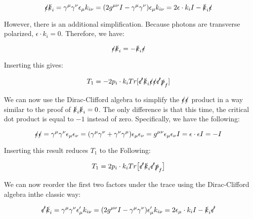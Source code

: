 \documentclass[a4]{article}
\begin{document}
    \begin{equation}
        \slashed{\epsilon} \slashed{k}_i = \gamma^{\mu} \gamma^{\nu} \epsilon_\mu k_{i \nu} = (2 g^{\mu \nu} I - \gamma^{\mu} \gamma^{\nu}) \epsilon_\mu k_{i \nu} = 2 \epsilon \cdot k_i I - \slashed{k}_i \slashed{\epsilon}
    \end{equation}

    However, there is an additional simplification. Because photons are transverse polarized, $\epsilon \cdot k_i = 0$. Therefore, we have:

    \begin{equation}
        \slashed{\epsilon} \slashed{k}_i = - \slashed{k}_i \slashed{\epsilon}
    \end{equation}

    Inserting this gives:

    \begin{equation}
        T_1 = -2 p_i \cdot k_i Tr[\slashed{\epsilon'} \slashed{k}_i \slashed{\epsilon} \slashed{\epsilon} \slashed{\epsilon'} \slashed{p}_f]
    \end{equation}

    We can now use the Dirac-Clifford algebra to simplify the $\slashed{\epsilon} \slashed{\epsilon}$ product in a way similar to the proof of $\slashed{k}_i \slashed{k}_i = 0$.
    The only difference is that this time, the critical dot product is equal to $-1$ instead of zero. Specifically, we have the following:

    \begin{equation}
        \slashed{\epsilon} \slashed{\epsilon} = \gamma^{\mu} \gamma^{\nu} \epsilon_\mu \epsilon_\nu = (\gamma^\mu \gamma^\nu + \gamma^\nu \gamma^\mu) \epsilon_{\mu} \epsilon_{\nu} = g^{\mu \nu} \epsilon_\mu \epsilon_\nu I = \epsilon \cdot \epsilon I = - I
    \end{equation}

    Inserting this result reduces $T_1$ to the Following:

    \begin{equation}
        T_1 = 2 p_i \cdot k_i Tr \big[ \slashed{\epsilon'} \slashed{k}_i \slashed{\epsilon'} \slashed{p}_f \big]
    \end{equation}

    We can now reorder the first two factors under the trace using the Dirac-Clifford algebra inthe classic way:

    \begin{equation}
        \slashed{\epsilon'} \slashed{k}_i = \gamma^{\mu} \gamma^{\nu} \epsilon'_{\mu} k_{i \nu} = (2 g^{\mu \nu} I - \gamma^{\mu} \gamma^{\nu}) \epsilon'_{\mu} k_{i \nu} = 2 \epsilon_{\mu} \cdot k_i I - \slashed{k}_i \slashed{\epsilon'}
    \end{equation}
\end{document}
